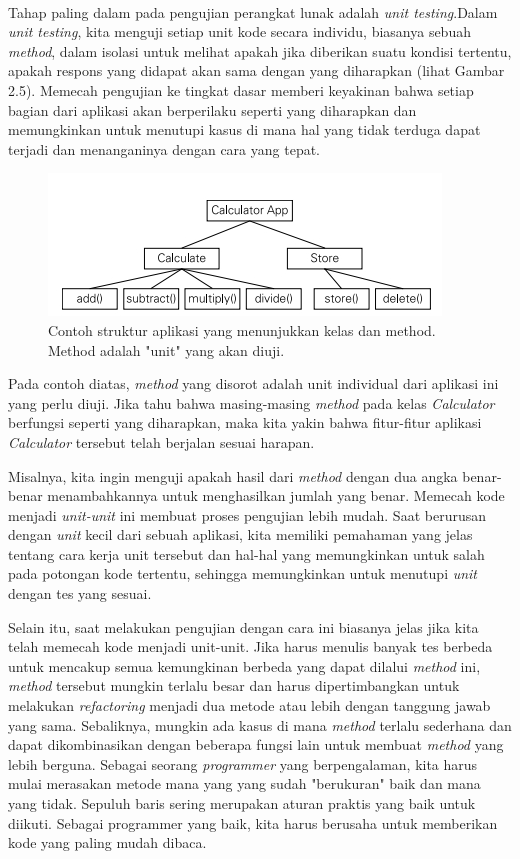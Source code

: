 \paragraph{}
Tahap paling dalam pada pengujian perangkat lunak adalah \textit{unit testing}.Dalam \textit{unit testing}, kita menguji setiap unit kode secara individu, biasanya sebuah \textit{method}, dalam isolasi untuk melihat apakah jika diberikan suatu kondisi tertentu, apakah respons yang didapat akan sama dengan yang diharapkan (lihat Gambar 2.5). Memecah pengujian ke tingkat dasar memberi keyakinan bahwa setiap bagian dari aplikasi akan berperilaku seperti yang diharapkan dan memungkinkan untuk menutupi kasus di mana hal yang tidak terduga dapat terjadi dan menanganinya dengan cara yang tepat.
\begin{figure}[h!]
	\includegraphics[scale=1.5]{gambar/unittest}
	\centering
	\caption{Contoh struktur aplikasi yang menunjukkan kelas dan method. Method adalah "unit" yang akan diuji.}
\end{figure}

Pada contoh diatas, \textit{method} yang disorot adalah unit individual dari aplikasi ini yang perlu diuji. Jika tahu bahwa masing-masing \textit{method} pada kelas \textit{Calculator} berfungsi seperti yang diharapkan, maka kita yakin bahwa fitur-fitur aplikasi \textit{Calculator} tersebut telah berjalan sesuai harapan.

Misalnya, kita ingin menguji apakah hasil dari \textit{method} dengan dua angka benar-benar menambahkannya untuk menghasilkan jumlah yang benar. Memecah kode menjadi \textit{unit-unit} ini membuat proses pengujian lebih mudah. Saat berurusan dengan \textit{unit} kecil dari sebuah aplikasi, kita memiliki pemahaman yang jelas tentang cara kerja unit tersebut dan hal-hal yang memungkinkan untuk salah pada potongan kode tertentu, sehingga memungkinkan untuk menutupi \textit{unit} dengan tes yang sesuai.

Selain itu, saat melakukan pengujian dengan cara ini biasanya jelas jika kita telah memecah kode menjadi unit-unit. Jika harus menulis banyak tes berbeda untuk mencakup semua kemungkinan berbeda yang dapat dilalui \textit{method} ini, \textit{method} tersebut mungkin terlalu besar dan harus dipertimbangkan untuk melakukan \textit{refactoring} menjadi dua metode atau lebih dengan tanggung jawab yang sama. Sebaliknya, mungkin ada kasus di mana \textit{method} terlalu sederhana dan dapat dikombinasikan dengan beberapa fungsi lain untuk membuat \textit{method} yang lebih berguna. Sebagai seorang \textit{programmer} yang berpengalaman, kita harus mulai merasakan metode mana yang yang sudah "berukuran" baik dan mana yang tidak. Sepuluh baris sering merupakan aturan praktis yang baik untuk diikuti. Sebagai programmer yang baik, kita harus berusaha untuk memberikan kode yang paling mudah dibaca.

